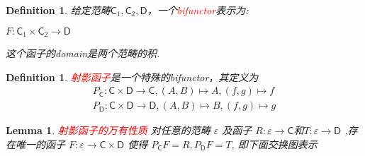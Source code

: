\documentclass{article}
\newtheorem{lemma}[theorem]{Lemma}
\newtheorem{definition}[theorem]{Definition}
\newcommand*{\cat}[1]{\textsf{#1}\xspace}
\newcommand{\redt}[1]{\textcolor{red}{#1}}
\begin{document}
\begin{definition}
\rm 给定范畴$\cat{C}_1,\cat{C}_2,\cat{D}$，一个\redt{bifunctor}表示为:
\begin{center}
$F \colon \cat{C}_1 \times \cat{C}_2 \rightarrow \cat{D}$
\end{center}
这个函子的domain是两个范畴的积. 
\end{definition}


\begin{definition}
\rm \redt{射影函子}是一个特殊的bifunctor，其定义为
$$
\begin{aligned}
P_{\cat{C}} \colon \cat{C} \times \cat{D} \rightarrow \cat{C},\left( A,B \right)\mapsto A,\left( f,g \right)\mapsto f \\
P_{\cat{D}} \colon \cat{C} \times \cat{D} \rightarrow \cat{D},\left( A,B \right)\mapsto B,\left( f,g \right)\mapsto g
\end{aligned}
$$
\end{definition}



\begin{lemma}
\rm \redt{射影函子的万有性质} 对任意的范畴 $\varepsilon$ 及函子 $R\colon \varepsilon \rightarrow \cat{C}$和$T\colon \varepsilon \rightarrow \cat{D}$ ,存在唯一的函子 $F\colon \varepsilon \rightarrow \cat{C}\times\cat{D}$ 使得 $P_{\cat{C}}F=R,P_{\cat{D}}F=T$, 即下面交换图表示
\begin{center}
\end{center}
\end{lemma}
\end{document}
